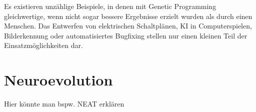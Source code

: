 Es existieren unzählige Beispiele, in denen mit Genetic Programming gleichwertige, wenn nicht sogar
bessere Ergebnisse erzielt wurden als durch einen Menschen. Das Entwerfen von elektrischen
Schaltplänen, KI in Computerspielen, Bilderkennung oder automatisiertes Bugfixing stellen nur einen
kleinen Teil der Einsatzmöglichkeiten dar. \cite{Koz10}


\section{Neuroevolution}
Hier könnte man bspw. NEAT erklären
